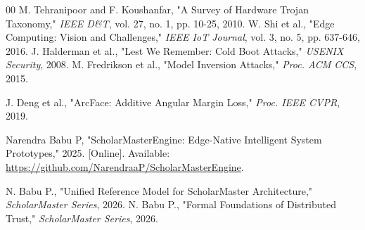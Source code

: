 \documentclass[conference]{IEEEtran}
\begin{document}
\begin{thebibliography}{00}
 M. Tehranipoor and F. Koushanfar, "A Survey of Hardware Trojan Taxonomy," \textit{IEEE D\&T}, vol. 27, no. 1, pp. 10-25, 2010.
 W. Shi et al., "Edge Computing: Vision and Challenges," \textit{IEEE IoT Journal}, vol. 3, no. 5, pp. 637-646, 2016.
 J. Halderman et al., "Lest We Remember: Cold Boot Attacks," \textit{USENIX Security}, 2008.
 M. Fredrikson et al., "Model Inversion Attacks," \textit{Proc. ACM CCS}, 2015.

 J. Deng et al., "ArcFace: Additive Angular Margin Loss," \textit{Proc. IEEE CVPR}, 2019.

 Narendra Babu P, "ScholarMasterEngine: Edge-Native Intelligent System Prototypes," 2025. [Online]. Available: \url{https://github.com/NarendraaP/ScholarMasterEngine}.


 N. Babu P., "Unified Reference Model for ScholarMaster Architecture," \textit{ScholarMaster Series}, 2026.
 N. Babu P., "Formal Foundations of Distributed Trust," \textit{ScholarMaster Series}, 2026.
\end{thebibliography}
\end{document}
